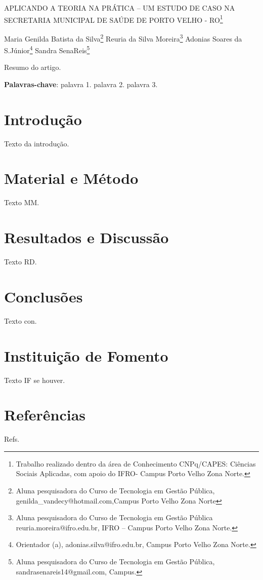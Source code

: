 \documentclass[article,12pt,onesidea,4paper,english,brazil]{abntex2}
\begin{document}
	
	
	\frenchspacing 
	
	\begin{center}
		\LARGE APLICANDO A TEORIA NA PRÁTICA – UM ESTUDO DE CASO NA SECRETARIA MUNICIPAL DE SAÚDE DE PORTO VELHO - RO\footnote{Trabalho realizado dentro da área de Conhecimento CNPq/CAPES: Ciências Sociais Aplicadas, com apoio do IFRO- Campus Porto Velho Zona Norte.}
	
	\normalsize
	Maria Genilda Batista da Silva\footnote{Aluna pesquisadora do Curso de Tecnologia em Gestão Pública, genilda\_vandecy@hotmail.com,Campus Porto Velho Zona Norte} 
	Reuria da Silva Moreira\footnote{Aluna pesquisadora do Curso de Tecnologia em Gestão Pública reuria.moreira@ifro.edu.br, IFRO – Campus Porto Velho Zona Norte.} 
	Adonias Soares da S.Júnior\footnote{Orientador (a), adonias.silva@ifro.edu.br, Campus Porto Velho Zona Norte.} 
	Sandra SenaReis\footnote{Aluna pesquisadora do Curso de Tecnologia em Gestão Pública, sandrasenareis14@gmail.com, Campus.} 
	\end{center}
	
	\begin{resumoumacoluna}
		Resumo do artigo.
		
		\vspace{\onelineskip}
		
		\noindent
		\textbf{Palavras-chave}: palavra 1. palavra 2. palavra 3.
	\end{resumoumacoluna}
	
	\textual
	
	\section*{Introdução}
	
	Texto da introdução.
	
	\section*{Material e Método}
	
	Texto MM.
	
	\section*{Resultados e Discussão}
	
	Texto RD.
	
	\section*{Conclusões}
	
	Texto con.
	
	\section*{Instituição de Fomento}
	
	Texto IF se houver.
	
	\section*{Referências}
	
	Refs.
	
\end{document}
